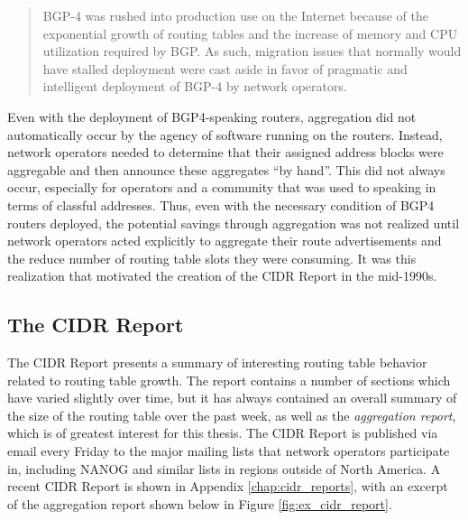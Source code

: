 \begin{quote} BGP-4 was rushed into production use on the Internet because of
the exponential growth of routing tables and the increase of memory and CPU
utilization required by BGP.  As such, migration issues that normally would
have stalled deployment were cast aside in favor of pragmatic and intelligent
deployment of BGP-4 by network operators.
\end{quote}

Even with the deployment of BGP4-speaking routers, aggregation did not
automatically occur by the agency of software running on the routers. Instead,
network operators needed to determine that their assigned address blocks were
aggregable and then announce these aggregates ``by hand''. This did not always
occur, especially for operators and a community that was used to speaking in
terms of classful addresses. Thus, even with the necessary condition of BGP4
routers deployed, the potential savings through aggregation was not realized
until network operators acted explicitly to aggregate their route
advertisements and the reduce number of routing table slots they were
consuming. It was this realization that motivated the creation of the CIDR
Report in the mid-1990s.

\subsection{The CIDR Report}

The CIDR Report presents a summary of interesting routing table behavior
related to routing table growth. The report contains a number of sections which
have varied slightly over time, but it has always contained an overall summary
of the size of the routing table over the past week, as well as the
\emph{aggregation report}, which is of greatest interest for this thesis. The
CIDR Report is published via email every Friday to the major mailing lists that
network operators participate in, including NANOG and similar lists in regions
outside of North America. A recent CIDR Report is shown in Appendix
\ref{chap:cidr_reports}, with an excerpt of the aggregation report shown below
in Figure \ref{fig:ex_cidr_report}.

